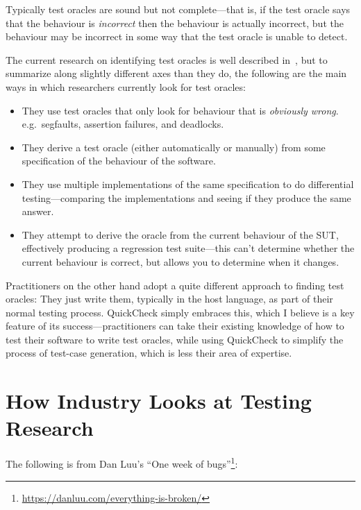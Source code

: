 Typically test oracles are sound but not complete---that is,
if the test oracle says that the behaviour is \emph{incorrect} then the behaviour is actually incorrect,
but the behaviour may be incorrect in some way that the test oracle is unable to detect.

The current research on identifying test oracles is well described in~\cite{DBLP:journals/tse/BarrHMSY15},
but to summarize along slightly different axes than they do,
the following are the main ways in which researchers currently look for test oracles:

\begin{itemize}
\item They use test oracles that only look for behaviour that is \emph{obviously wrong}.
e.g.\ segfaults, assertion failures, and deadlocks.
\item They derive a test oracle (either automatically or manually) from some specification of the behaviour of the software.
\item They use multiple implementations of the same specification to do differential testing---comparing
the implementations and seeing if they produce the same answer.
\item They attempt to derive the oracle from the current behaviour of the SUT,
effectively producing a regression test suite---this
can't determine whether the current behaviour is correct,
but allows you to determine when it changes.
\end{itemize}

Practitioners on the other hand adopt a quite different approach to finding test oracles:
They just write them,
typically in the host language,
as part of their normal testing process.
QuickCheck simply embraces this,
which I believe is a key feature of its success---practitioners
can take their existing knowledge of how to test their software to write test oracles,
while using QuickCheck to simplify the process of test-case generation,
which is less their area of expertise.

\chapter{How Industry Looks at Testing Research}

The following is from Dan Luu's ``One week of bugs''\footnote{\url{https://danluu.com/everything-is-broken/}}:


